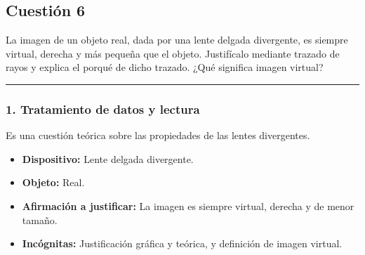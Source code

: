 \newpage


\subsection{Cuestión 6}
\label{subsec:C6_2020_sep_ext}

\begin{cajaenunciado}
La imagen de un objeto real, dada por una lente delgada divergente, es siempre virtual, derecha y más pequeña que el objeto. Justifícalo mediante trazado de rayos y explica el porqué de dicho trazado. ¿Qué significa imagen virtual?
\end{cajaenunciado}
\hrule

\subsubsection*{1. Tratamiento de datos y lectura}
Es una cuestión teórica sobre las propiedades de las lentes divergentes.
\begin{itemize}
    \item \textbf{Dispositivo:} Lente delgada divergente.
    \item \textbf{Objeto:} Real.
    \item \textbf{Afirmación a justificar:} La imagen es siempre virtual, derecha y de menor tamaño.
    \item \textbf{Incógnitas:} Justificación gráfica y teórica, y definición de imagen virtual.
\end{itemize}

